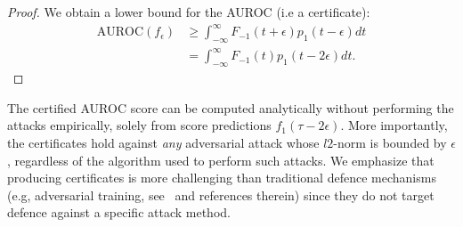 \begin{proof}
We obtain a lower bound for the AUROC (i.e a certificate):
\begin{equation}
\begin{aligned}
    \text{AUROC}(f_{\epsilon}) &\geq \int_{-\infty}^{\infty} F_{-1}(t+\epsilon)p_1(t-\epsilon)dt\\
                               &= \int_{-\infty}^{\infty} F_{-1}(t)p_1(t-2\epsilon)dt.
\end{aligned}
\end{equation}

\end{proof}
The certified AUROC score can be computed analytically without performing the attacks empirically, solely from score predictions $f_1(\tau-2\epsilon)$. More importantly, the certificates hold against \textit{any} adversarial attack whose $l2$-norm is bounded by $\epsilon$, regardless of the algorithm used to perform such attacks. We emphasize that producing certificates is more challenging than traditional defence mechanisms (e.g, adversarial training, see~\cite{ijcai2021p591} and references therein) since they do not target defence against a specific attack method. 





